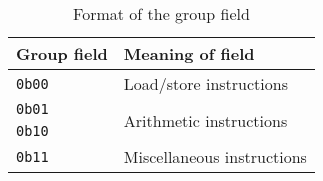 \begin{table}[ht]
    \centering
    \begin{tabular}{|l l|}
        \hline
        \textbf{Group field} & \textbf{Meaning of field} \\
        \hline
        \texttt{0b00} & Load/store instructions \\
        \hline
        \texttt{0b01} & \multirow{2}{*}{Arithmetic instructions} \\
        \texttt{0b10} & \\
        \hline
        \texttt{0b11} & Miscellaneous instructions \\
        \hline
    \end{tabular}
    
    \caption{Format of the group field}
    \label{tab:group_fmt}
\end{table}
